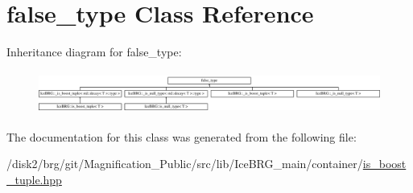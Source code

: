\hypertarget{classstd_1_1false__type}{\section{false\-\_\-type Class Reference}
\label{classstd_1_1false__type}
}
Inheritance diagram for false\-\_\-type\-:\begin{figure}[H]
\begin{center}
\leavevmode
\includegraphics[height=1.414141cm]{classstd_1_1false__type}
\end{center}
\end{figure}


The documentation for this class was generated from the following file\-:\begin{DoxyCompactItemize}
\item 
/disk2/brg/git/\-Magnification\-\_\-\-Public/src/lib/\-Ice\-B\-R\-G\-\_\-main/container/\hyperlink{is__boost__tuple_8hpp}{is\-\_\-boost\-\_\-tuple.\-hpp}\end{DoxyCompactItemize}
